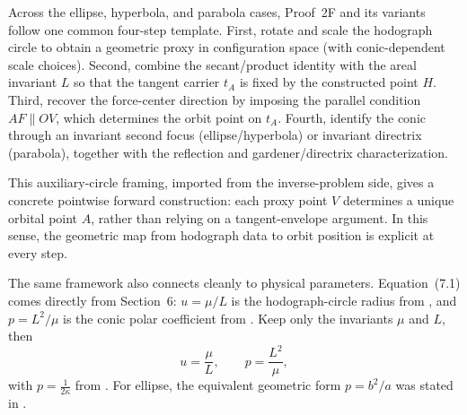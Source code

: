 Across the ellipse, hyperbola, and parabola cases, Proof~2F and its variants follow one common four-step template. First, rotate and scale the hodograph circle to obtain a geometric proxy in configuration space (with conic-dependent scale choices). Second, combine the secant/product identity with the areal invariant \(L\) so that the tangent carrier \(t_A\) is fixed by the constructed point \(H\). Third, recover the force-center direction by imposing the parallel condition \(AF\parallel OV\), which determines the orbit point on \(t_A\). Fourth, identify the conic through an invariant second focus (ellipse/hyperbola) or invariant directrix (parabola), together with the reflection and gardener/directrix characterization.

This auxiliary-circle framing, imported from the inverse-problem side, gives a concrete pointwise forward construction: each proxy point \(V\) determines a unique orbital point \(A\), rather than relying on a tangent-envelope argument. In this sense, the geometric map from hodograph data to orbit position is explicit at every step.

The same framework also connects cleanly to physical parameters. Equation~(7.1) comes directly from Section~6: \(u=\mu/L\) is the hodograph-circle radius from , and \(p=L^2/\mu\) is the conic polar coefficient from . Keep only the invariants \(\mu\) and \(L\), then
\begin{equation}
  u=\frac{\mu}{L},
  \qquad
  p=\frac{L^2}{\mu},
\end{equation}
with \(p=\frac{1}{2\kappa}\) from .
For ellipse, the equivalent geometric form \(p=b^2/a\) was stated in .

